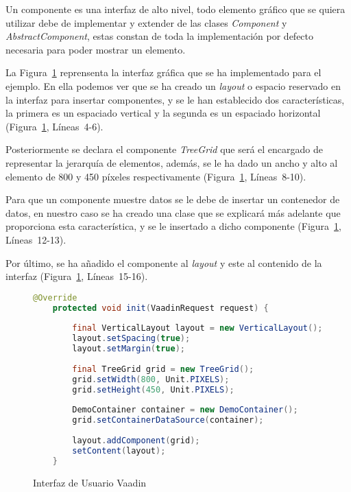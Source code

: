 Un componente es una interfaz de alto nivel, todo elemento gráfico que se quiera utilizar debe de implementar y extender de las clases \emph{Component}\cite{componentVaadin} y \emph{AbstractComponent}\cite{abstractComponentVaadin}, estas constan de toda la implementación por defecto necesaria para poder mostrar un elemento.

La Figura~\ref{fig:uiVaadin} reprensenta la interfaz gráfica que se ha implementado para el ejemplo. En ella podemos ver que se ha creado un \emph{layout} o espacio reservado en la interfaz para insertar componentes, y se le han establecido dos características, la primera es un espaciado vertical y la segunda es un espaciado horizontal (Figura~\ref{fig:uiVaadin}, Líneas~4-6).

Posteriormente se declara el componente \emph{TreeGrid} que será el encargado de representar la jerarquía de elementos, además, se le ha dado un ancho y alto al elemento de 800 y 450 píxeles respectivamente (Figura~\ref{fig:uiVaadin}, Líneas~8-10).

Para que un componente muestre datos se le debe de insertar un contenedor de datos, en nuestro caso se ha creado una clase que se explicará más adelante que proporciona esta característica, y se le insertado a dicho componente (Figura~\ref{fig:uiVaadin}, Líneas~12-13).

Por último, se ha añadido el componente al \emph{layout} y este al contenido de la interfaz (Figura~\ref{fig:uiVaadin}, Líneas~15-16).

\begin{figure}[!tb]
	\centering
	\begin{lstlisting}[language=Java]
	@Override
	protected void init(VaadinRequest request) {
	
		final VerticalLayout layout = new VerticalLayout();
		layout.setSpacing(true);
		layout.setMargin(true);
		
		final TreeGrid grid = new TreeGrid();
		grid.setWidth(800, Unit.PIXELS);
		grid.setHeight(450, Unit.PIXELS);
		
		DemoContainer container = new DemoContainer();
		grid.setContainerDataSource(container);
		
		layout.addComponent(grid);
		setContent(layout);
	}
	\end{lstlisting}
	\caption{Interfaz de Usuario Vaadin}
	\label{fig:uiVaadin}
\end{figure}




